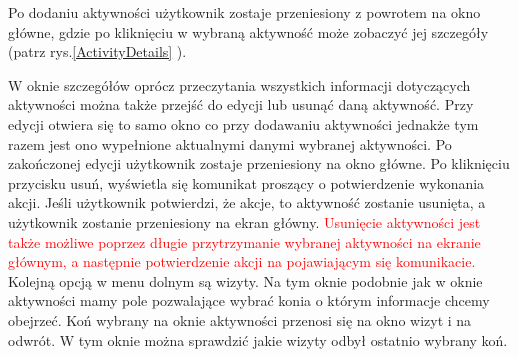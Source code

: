 \documentclass[12pt,oneside]{report}
\begin{document}
Po dodaniu aktywności użytkownik zostaje przeniesiony z powrotem na okno główne, gdzie po kliknięciu w wybraną aktywność może zobaczyć jej szczegóły (patrz rys.\ref{ActivityDetails} ). 

W oknie szczegółów oprócz przeczytania wszystkich informacji dotyczących aktywności można także przejść do edycji lub usunąć daną aktywność. Przy edycji otwiera się to samo okno co przy dodawaniu aktywności jednakże tym razem jest ono wypełnione aktualnymi danymi wybranej aktywności. Po zakończonej edycji użytkownik zostaje przeniesiony na okno główne. Po kliknięciu przycisku usuń, wyświetla się komunikat proszący o potwierdzenie wykonania akcji. Jeśli użytkownik potwierdzi, że akcje, to aktywność zostanie usunięta, a użytkownik zostanie przeniesiony na ekran główny. \textcolor{red}{Usunięcie aktywności jest także możliwe poprzez długie przytrzymanie wybranej aktywności na ekranie głównym, a następnie potwierdzenie akcji na pojawiającym się komunikacie.}
\newpage
Kolejną opcją w menu dolnym są wizyty. Na tym oknie podobnie jak w oknie aktywności mamy pole pozwalające wybrać konia o którym informacje chcemy obejrzeć. Koń wybrany na oknie aktywności przenosi się na okno wizyt i na odwrót. W tym oknie można sprawdzić jakie wizyty odbył ostatnio wybrany koń. 
\end{document}
